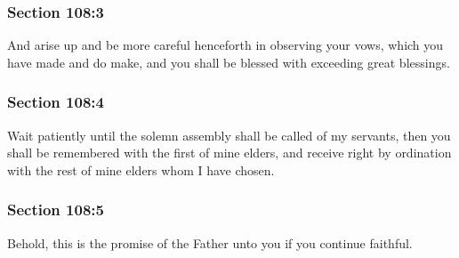 	\subsubsection{Section 108:3} %
		\label{DC108-3}

		And arise up and be more careful henceforth in observing your vows, which you have made and do make, and you shall be blessed with exceeding great blessings.


	\subsubsection{Section 108:4} %
		\label{DC108-4}

		Wait patiently until the solemn assembly shall be called of my servants, then you shall be remembered with the first of mine elders, and receive right by ordination with the rest of mine elders whom I have chosen.


	\subsubsection{Section 108:5} %
		\label{DC108-5}

		Behold, this is the promise of the Father unto you if you continue faithful.


